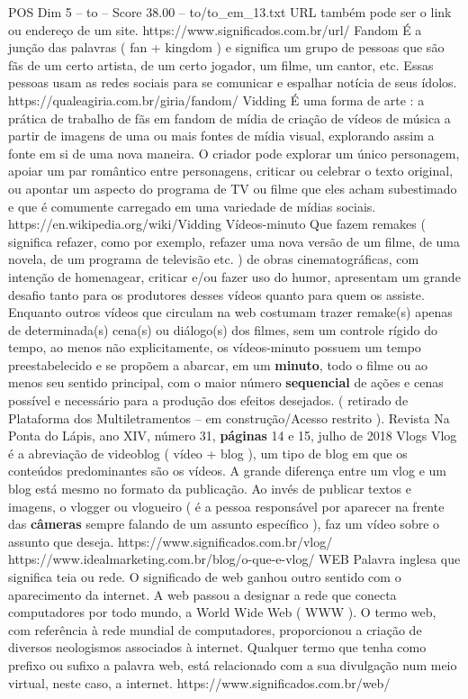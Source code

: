 \begin{textsample}{POS Dim 5 – to – Score 38.00 – to/to\_em\_13.txt}
URL também pode ser o link ou endereço de um site. https://www.significados.com.br/url/ Fandom É a junção das palavras ( fan + kingdom ) e significa um grupo de pessoas que são fãs de um certo artista, de um certo jogador, um filme, um cantor, etc.
Essas pessoas usam as redes sociais para se comunicar e espalhar notícia de seus ídolos. https://qualeagiria.com.br/giria/fandom/ Vidding É uma forma de arte : a prática de trabalho de fãs em fandom de mídia de criação de vídeos de música a partir de imagens de uma ou mais fontes de mídia visual, explorando assim a fonte em si de uma nova maneira.
O criador pode explorar um único personagem, apoiar um par romântico entre personagens, criticar ou celebrar o texto original, ou apontar um aspecto do programa de TV ou filme que eles acham subestimado e que é comumente carregado em uma variedade de mídias sociais. https://en.wikipedia.org/wiki/Vidding Vídeos-minuto Que fazem remakes ( significa refazer, como por exemplo, refazer uma nova versão de um filme, de uma novela, de um programa de televisão etc. ) de obras cinematográficas, com intenção de homenagear, criticar e/ou fazer uso do humor, apresentam um grande desafio tanto para os produtores desses vídeos quanto para quem os assiste.
Enquanto outros vídeos que circulam na web costumam trazer remake(s) apenas de determinada(s) cena(s) ou diálogo(s) dos filmes, sem um controle rígido do tempo, ao menos não explicitamente, os vídeos-minuto possuem um tempo preestabelecido e se propõem a abarcar, em um \textbf{minuto}, todo o filme ou ao menos seu sentido principal, com o maior número \textbf{sequencial} de ações e cenas possível e necessário para a produção dos efeitos desejados. ( retirado de Plataforma dos Multiletramentos – em construção/Acesso restrito ).
Revista Na Ponta do Lápis, ano XIV, número 31, \textbf{páginas} 14 e 15, julho de 2018 Vlogs Vlog é a abreviação de videoblog ( vídeo + blog ), um tipo de blog em que os conteúdos predominantes são os vídeos.
A grande diferença entre um vlog e um blog está mesmo no formato da publicação.
Ao invés de publicar textos e imagens, o vlogger ou vlogueiro ( é a pessoa responsável por aparecer na frente das \textbf{câmeras} sempre falando de um assunto específico ), faz um vídeo sobre o assunto que deseja. https://www.significados.com.br/vlog/ https://www.idealmarketing.com.br/blog/o-que-e-vlog/ WEB Palavra inglesa que significa teia ou rede.
O significado de web ganhou outro sentido com o aparecimento da internet.
A web passou a designar a rede que conecta computadores por todo mundo, a World Wide Web ( WWW ).
O termo web, com referência à rede mundial de computadores, proporcionou a criação de diversos neologismos associados à internet.
Qualquer termo que tenha como prefixo ou sufixo a palavra web, está relacionado com a sua divulgação num meio virtual, neste caso, a internet. https://www.significados.com.br/web/


\end{textsample}
